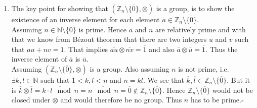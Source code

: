 \documentclass[solution]{tudexercise}
\newcommand{\qed}{\hspace*{\fill}$\square$}
\begin{document}
\begin{enumerate}
				\item
				The key point for showing that $(\mathbb{Z}_n \setminus \{\overline{0}\}, \otimes)$ is a group, is to show the existence of an inverse element for each element $\overline{a} \in \mathbb{Z}_n \setminus \{\overline{0}\}$.\\
				Assuming $n \in \mathbb{N} \setminus \{0\}$ is prime. Hence $a$ and $n$ are relatively prime and with that we know from Bézout theorem that there are two integers $u$ and $v$ such that $au + nv = 1$. That implies $\overline{au} \otimes \overline{nv} = \overline{1}$ and also $\overline{a} \otimes \overline{u} = \overline{1}$. Thus the inverse element of $\overline{a}$ is $\overline{u}$.\\
				Assuming $(\mathbb{Z}_n \setminus \{\overline{0}\}, \otimes)$ is a group. Also assuming $n$ is not prime, i.e. $\exists k, l \in \mathbb{N}$ such that $1 < k, l < n$ and $n = kl$. We see that $\overline{k}, \overline{l} \in \mathbb{Z}_n \setminus \{\overline{0}\}$. But it is $\overline{k} \otimes \overline{l} = \overline{k \cdot l \mod n} = \overline{n \mod n} = \overline{0} \notin \mathbb{Z}_n \setminus \{\overline{0}\}$. Hence $\mathbb{Z}_n \setminus \{\overline{0}\}$ would not be closed under $\otimes$ and would therefore be no group. Thus $n$ has to be prime.\qed
				\end{enumerate}
	
	
	
\end{document}
